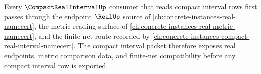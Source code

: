 \begin{proposition}
\label{prop:compact-real-interval-real-source-route}
Every $\CompactRealIntervalUp$ consumer that reads compact interval rows first passes through the endpoint $\RealUp$ source of \autoref{ch:concrete-instances-real-namecert}, the metric reading surface of \autoref{ch:concrete-instances-real-metric-namecert}, and the finite-net route recorded by \autoref{ch:concrete-instances-compact-real-interval-namecert}. The compact interval packet therefore exposes real endpoints, metric comparison data, and finite-net compatibility before any compact interval row is exported.
\end{proposition}

